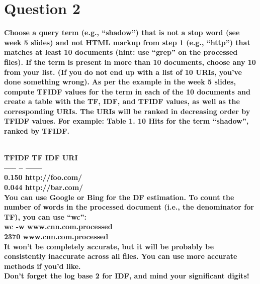 \chapter{Question 2}
\label{avoiding-uri-aliases} 

\textbf {Choose a query term (e.g., ``shadow'') that is not a stop word (see week 5 slides) and not HTML markup from step 1 (e.g., ``http'') that matches at least 10 documents (hint: use ``grep'' on the processed files).  If the term is present in more than 10 documents, choose any 10 from your list.  (If you do not end up with a list of 10 URIs, you've done something wrong).}
\textbf {As per the example in the week 5 slides, compute TFIDF values for the term in each of the 10 documents and create a table with the TF, IDF, and TFIDF values, as well as the corresponding URIs.  The URIs will be ranked in decreasing order by TFIDF values.  For example:
Table 1. 10 Hits for the term ``shadow'', ranked by TFIDF.}

\textbf{\\
TFIDF \qquad TF	  \qquad IDF	\qquad \qquad URI\\
----- \qquad \qquad --	  \qquad ---\qquad \qquad \qquad ---\\
0.150 \qquad http://foo.com/\\
0.044 \qquad http://bar.com/\\
You can use Google or Bing for the DF estimation.  To count the number of words in the processed document (i.e., the denominator for TF), you can use ``wc'':\\
wc -w www.cnn.com.processed\\
2370 www.cnn.com.processed}\\
\textbf{It won't be completely accurate, but it will be probably be consistently inaccurate across all files.  You can use more  accurate methods if you'd like.\\
Don't forget the log base 2 for IDF, and mind your significant digits!}


